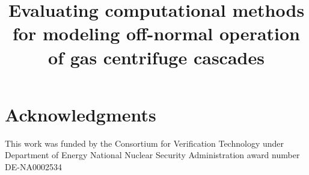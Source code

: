 \documentclass[12pt]{article}
\title{Evaluating computational methods for modeling off-normal operation of gas centrifuge cascades}
\date{}
\begin{document}
\maketitle














\section{Acknowledgments}
This work was funded by the Consortium for Verification Technology under
Department of Energy National Nuclear Security Administration award number
DE-NA0002534



%

\begin{small}

\end{small}
\end{document}

